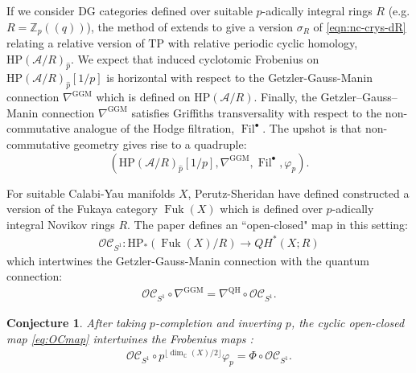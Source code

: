 \documentclass[reqno]{amsart}
\numberwithin{equation}{section}
\numberwithin{equation}{section}
\numberwithin{equation}{section}
\newtheorem{conj}[thm]{Conjecture}
\theoremstyle{definition}
\theoremstyle{remark}
\theoremstyle{remark}
\begin{document}
If we consider DG categories defined over suitable $p$-adically integral rings $R$ (e.g. $R=\mathbb{Z}_p((q))$), the method of \cite{raksitsanath} extends to give a version $\sigma_R$ of \eqref{eqn:nc-crys-dR} relating a relative version of $\mathrm{TP}$ with relative periodic cyclic homology, $\mathrm{HP}(\mathcal{A}/R)_{\hat{p}}.$ We expect that induced cyclotomic Frobenius on $\mathrm{HP}(\mathcal{A}/R)_{\hat{p}}[1/p]$ is horizontal with respect to the Getzler-Gauss-Manin connection $\nabla^{\mathrm{GGM}}$ which is defined on $\mathrm{HP}(\mathcal{A}/R)$. Finally, the Getzler--Gauss--Manin connection $\nabla^{\mathrm{GGM}}$ satisfies Griffiths transversality with respect to the non-commutative analogue of the Hodge filtration, $\operatorname{Fil}^{\bullet}$. The upshot is that non-commutative geometry gives rise to a quadruple:
\begin{equation}
    (\mathrm{HP}(\mathcal{A}/R)_{\hat{p}}[1/p], \nabla^{\mathrm{GGM}}, \operatorname{Fil}^{\bullet}, \varphi_p).
\end{equation}

For suitable Calabi-Yau manifolds $X$,  Perutz-Sheridan \cite{rel-Fuk} have defined constructed a version of the Fukaya category $\operatorname{Fuk}(X)$ which is defined over $p$-adically integral Novikov rings $R$. The paper \cite{ganatra2025cyclic} defines an ``open-closed" map in this setting:  \begin{align}\label{eq:OCmap} \mathcal{OC}_{S^1}: \mathrm{HP}_*(\operatorname{Fuk}(X)/R) \to QH^*(X;R) \end{align}
which intertwines the Getzler-Gauss-Manin connection with the quantum connection: \begin{align} \mathcal{OC}_{S^1} \circ \nabla^{\mathrm{GGM}}= \nabla^{\mathrm{QH}} \circ \mathcal{OC}_{S^1}. \end{align}
\begin{conj}\label{conj:open-closed}
    After taking $p$-completion and inverting $p$, the cyclic open-closed map \eqref{eq:OCmap} intertwines the Frobenius maps : \begin{align} \mathcal{OC}_{S^1} \circ p^{\lfloor \operatorname{dim}_{\mathbb{C}}(X)/2 \rfloor} \varphi_p= \Phi \circ \mathcal{OC}_{S^1}. \end{align}
\end{conj}
\end{document}
